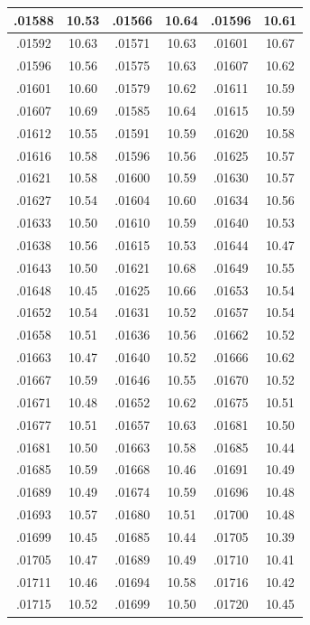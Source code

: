 \documentclass[10pt,twoside]{report}
\begin{document}
\begin{appendices}
\begin{longtable}{|c|c||c|c||c|c|}
.01588 & 10.53 & .01566 & 10.64 & .01596 & 10.61\\\hline
.01592 & 10.63 & .01571 & 10.63 & .01601 & 10.67\\\hline
.01596 & 10.56 & .01575 & 10.63 & .01607 & 10.62\\\hline
.01601 & 10.60 & .01579 & 10.62 & .01611 & 10.59\\\hline
.01607 & 10.69 & .01585 & 10.64 & .01615 & 10.59\\\hline
.01612 & 10.55 & .01591 & 10.59 & .01620 & 10.58\\\hline
.01616 & 10.58 & .01596 & 10.56 & .01625 & 10.57\\\hline
.01621 & 10.58 & .01600 & 10.59 & .01630 & 10.57\\\hline
.01627 & 10.54 & .01604 & 10.60 & .01634 & 10.56\\\hline
.01633 & 10.50 & .01610 & 10.59 & .01640 & 10.53\\\hline
.01638 & 10.56 & .01615 & 10.53 & .01644 & 10.47\\\hline
.01643 & 10.50 & .01621 & 10.68 & .01649 & 10.55\\\hline
.01648 & 10.45 & .01625 & 10.66 & .01653 & 10.54\\\hline
.01652 & 10.54 & .01631 & 10.52 & .01657 & 10.54\\\hline
.01658 & 10.51 & .01636 & 10.56 & .01662 & 10.52\\\hline
.01663 & 10.47 & .01640 & 10.52 & .01666 & 10.62\\\hline
.01667 & 10.59 & .01646 & 10.55 & .01670 & 10.52\\\hline
.01671 & 10.48 & .01652 & 10.62 & .01675 & 10.51\\\hline
.01677 & 10.51 & .01657 & 10.63 & .01681 & 10.50\\\hline
.01681 & 10.50 & .01663 & 10.58 & .01685 & 10.44\\\hline
.01685 & 10.59 & .01668 & 10.46 & .01691 & 10.49\\\hline
.01689 & 10.49 & .01674 & 10.59 & .01696 & 10.48\\\hline
.01693 & 10.57 & .01680 & 10.51 & .01700 & 10.48\\\hline
.01699 & 10.45 & .01685 & 10.44 & .01705 & 10.39\\\hline
.01705 & 10.47 & .01689 & 10.49 & .01710 & 10.41\\\hline
.01711 & 10.46 & .01694 & 10.58 & .01716 & 10.42\\\hline
.01715 & 10.52 & .01699 & 10.50 & .01720 & 10.45\\\hline

\end{longtable}
\end{appendices}
\end{document}
